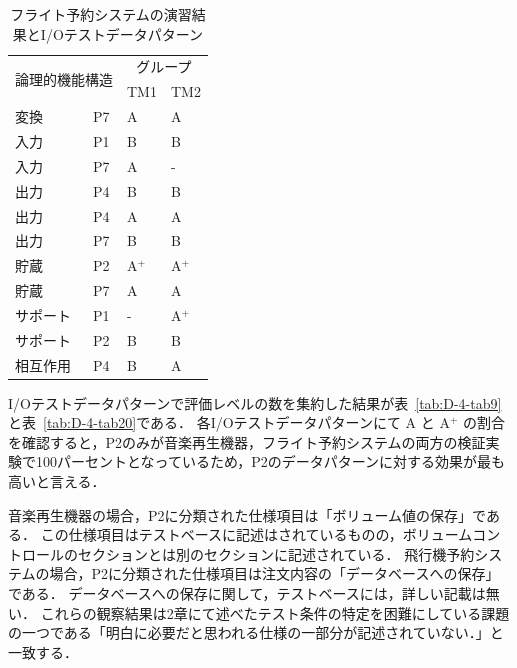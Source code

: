 \begin{table}[htbp]
  \centering
\caption{フライト予約システムの演習結果とI/Oテストデータパターン}
    \begin{tabular}{|l|l|l|l|}
    \hline
    \multicolumn{2}{|c|}{\multirow{2}[4]{*}{論理的機能構造}} & \multicolumn{2}{c|}{グループ} \bigstrut\\
\cline{3-4}    \multicolumn{2}{|c|}{} & TM1   & TM2 \bigstrut\\
    \hline
    \hline
    変換 & P7    & A     & A \bigstrut\\
    \hline
    入力 & P1    & B     & B \bigstrut\\
    \hline
    入力 & P7    & A     & - \bigstrut\\
    \hline
    出力 & P4    & B     & B \bigstrut\\
    \hline
    出力 & P4    & A     & A \bigstrut\\
    \hline
    出力 & P7    & B     & B \bigstrut\\
    \hline
    貯蔵 & P2    & A${}^\text{+}$    & A${}^\text{+}$ \bigstrut\\
    \hline
    貯蔵 & P7    & A     & A \bigstrut\\
    \hline
    サポート & P1    & -     & A${}^\text{+}$ \bigstrut\\
    \hline
    サポート & P2    & B     & B \bigstrut\\
    \hline
    相互作用 & P4    & B     & A \bigstrut\\
    \hline
    \end{tabular}%
\label{tab:D-4-tab8}%
\end{table}%

I/Oテストデータパターンで評価レベルの数を集約した結果が表~\ref{tab:D-4-tab9}と表~\ref{tab:D-4-tab20}である．
各I/Oテストデータパターンにて A と A${}^\text{+}$ の割合を確認すると，P2のみが音楽再生機器，フライト予約システムの両方の検証実験で100パーセントとなっているため，P2のデータパターンに対する効果が最も高いと言える．

音楽再生機器の場合，P2に分類された仕様項目は「ボリューム値の保存」である．
この仕様項目はテストベースに記述はされているものの，ボリュームコントロールのセクションとは別のセクションに記述されている．
飛行機予約システムの場合，P2に分類された仕様項目は注文内容の「データベースへの保存」である．
データベースへの保存に関して，テストベースには，詳しい記載は無い．
これらの観察結果は2章にて述べたテスト条件の特定を困難にしている課題の一つである「明白に必要だと思われる仕様の一部分が記述されていない．」と一致する．

